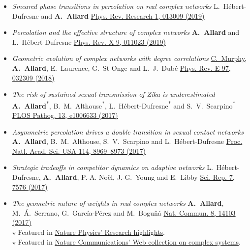 \documentclass[11pt]{article}
\begin{document}
\begin{itemize}[itemsep=0.5em]
%
  \item \textit{Smeared phase transitions in percolation on real complex networks}\split
  L.~H\'ebert-Dufresne and \textbf{A.~Allard}\split
  \href{http://doi.org/10.1103/PhysRevResearch.1.013009}{Phys. Rev. Research 1, 013009 (2019)}
%
  \item \textit{Percolation and the effective structure of complex networks}\split
  \textbf{A.~Allard} and L.~H\'ebert-Dufresne\split
  \href{http://doi.org/10.1103/PhysRevX.9.011023}{Phys. Rev. X 9, 011023 (2019)}
%
  \item \textit{Geometric evolution of complex networks with degree correlations}\split
  \uline{C.~Murphy}, \textbf{A.~Allard}, E.~Laurence, G.~St-Onge and L.~J.~Dub\'e\split
  \href{http://doi.org/10.1103/PhysRevE.97.032309}{Phys. Rev. E 97, 032309 (2018)}
%
  \item \textit{The risk of sustained sexual transmission of Zika is underestimated}\split
  \textbf{A.~Allard}\textsuperscript{*}, B.~M.~Althouse\textsuperscript{*}, L.~H\'ebert-Dufresne\textsuperscript{*} and S.~V.~Scarpino\textsuperscript{*}\split
  \href{http://dx.doi.org/10.1371/journal.ppat.1006633}{PLOS Pathog. 13, e1006633 (2017)}
%
  \item \textit{Asymmetric percolation drives a double transition in sexual contact networks}\split
  \textbf{A.~Allard}, B.~M.~Althouse, S.~V.~Scarpino and L.~H\'ebert-Dufresne\split
  \href{http://dx.doi.org/10.1073/pnas.1703073114}{Proc. Natl. Acad. Sci. USA 114, 8969--8973 (2017)}
%
  \item \textit{Strategic tradeoffs in competitor dynamics on adaptive networks}\split
  L.~H\'ebert-Dufresne, \textbf{A.~Allard}, P.-A. No\H{e}l, J.-G.~Young and E.~Libby\split
  \href{http://dx.doi.org/10.1038/s41598-017-07621-x}{Sci. Rep. 7, 7576 (2017)}
%
  \item \textit{The geometric nature of weights in real complex networks}\split
  \textbf{A.~Allard}, M.~\'A.~Serrano, G.~Garc\'ia-P\'erez and M.~Bogu\~n\'a\split
  \href{http://doi.org/10.1038/ncomms14103}{Nat. Commun. 8, 14103 (2017)}\\
  {\footnotesize $\star$ Featured in \href{http://dx.doi.org/10.1038/nphys4046}{Nature Physics' Research highlights}.}\\
  {\footnotesize $\star$ Featured in \href{https://www.nature.com/collections/ycjylwzvmz/}{Nature Communications' Web collection on complex systems}.}

\end{itemize}
\end{document}
